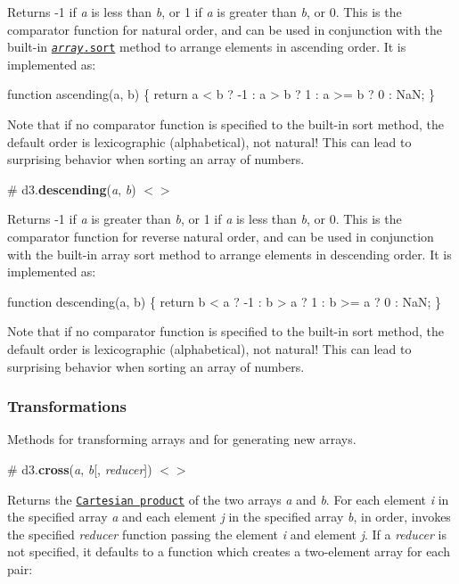Returns -\/1 if {\itshape a} is less than {\itshape b}, or 1 if {\itshape a} is greater than {\itshape b}, or 0. This is the comparator function for natural order, and can be used in conjunction with the built-\/in \href{https://developer.mozilla.org/en-US/docs/Web/JavaScript/Reference/Global_Objects/Array/sort}{\tt {\itshape array}.sort} method to arrange elements in ascending order. It is implemented as\+:


\begin{DoxyCode}
function ascending(a, b) \{
  return a < b ? -1 : a > b ? 1 : a >= b ? 0 : NaN;
\}
\end{DoxyCode}


Note that if no comparator function is specified to the built-\/in sort method, the default order is lexicographic (alphabetical), not natural! This can lead to surprising behavior when sorting an array of numbers.

\label{_descending}%
\# d3.{\bfseries descending}({\itshape a}, {\itshape b}) \href{https://github.com/d3/d3-array/blob/master/src/descending.js}{\tt $<$$>$}

Returns -\/1 if {\itshape a} is greater than {\itshape b}, or 1 if {\itshape a} is less than {\itshape b}, or 0. This is the comparator function for reverse natural order, and can be used in conjunction with the built-\/in array sort method to arrange elements in descending order. It is implemented as\+:


\begin{DoxyCode}
function descending(a, b) \{
  return b < a ? -1 : b > a ? 1 : b >= a ? 0 : NaN;
\}
\end{DoxyCode}


Note that if no comparator function is specified to the built-\/in sort method, the default order is lexicographic (alphabetical), not natural! This can lead to surprising behavior when sorting an array of numbers.

\subsubsection*{Transformations}

Methods for transforming arrays and for generating new arrays.

\label{_cross}%
\# d3.{\bfseries cross}({\itshape a}, {\itshape b}\mbox{[}, {\itshape reducer}\mbox{]}) \href{https://github.com/d3/d3-array/blob/master/src/cross.js}{\tt $<$$>$}

Returns the \href{https://en.wikipedia.org/wiki/Cartesian_product}{\tt Cartesian product} of the two arrays {\itshape a} and {\itshape b}. For each element {\itshape i} in the specified array {\itshape a} and each element {\itshape j} in the specified array {\itshape b}, in order, invokes the specified {\itshape reducer} function passing the element {\itshape i} and element {\itshape j}. If a {\itshape reducer} is not specified, it defaults to a function which creates a two-\/element array for each pair\+:


